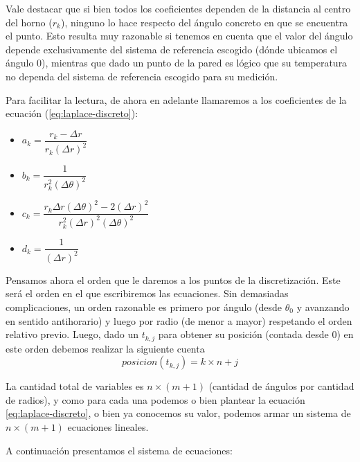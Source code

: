 Vale destacar que si bien todos los coeficientes dependen de la distancia al centro del horno ($r_k$), ninguno lo hace respecto del ángulo concreto en que se encuentra el punto. Esto resulta muy razonable si tenemos en cuenta que el valor del ángulo depende exclusivamente del sistema de referencia escogido (dónde ubicamos el ángulo 0), mientras que dado un punto de la pared es lógico que su temperatura no dependa del sistema de referencia escogido para su medición.

Para facilitar la lectura, de ahora en adelante llamaremos a los coeficientes de la ecuación (\ref{eq:laplace-discreto}): 
\begin{itemize}
\item $a_k = \dfrac{r_k - \Delta r}{r_k (\Delta r)^2}$ 
\item $b_k = \dfrac{1}{r_k^2(\Delta \theta)^2}$ 
\item $c_k = \dfrac{r_k \Delta r (\Delta \theta)^2 - 2(\Delta r)^2}{r_k^2 (\Delta r)^2 (\Delta \theta)^2}$ 
\item $d_k = \dfrac{1}{(\Delta r)^2}$
\end{itemize}

Pensamos ahora el orden que le daremos a los puntos de la discretización. Este será el orden en el que escribiremos las ecuaciones. Sin demasiadas complicaciones, un orden razonable es primero por ángulo (desde $\theta_0$ y avanzando en sentido antihorario) y luego por radio (de menor a mayor) respetando el orden relativo previo. Luego, dado un $t_{k,j}$ para obtener su posición (contada desde 0) en este orden debemos realizar la siguiente cuenta
\begin{equation}
\label{eq:posicion}
	posicion(t_{k,j}) = k\times n + j
\end{equation}

La cantidad total de variables es $n\times(m+1)$ (cantidad de ángulos por cantidad de radios), y como para cada una podemos o bien plantear la ecuación \ref{eq:laplace-discreto}, o bien ya conocemos su valor, podemos armar un sistema de $n\times(m+1)$ ecuaciones lineales.

A continuación presentamos el sistema de ecuaciones: 

